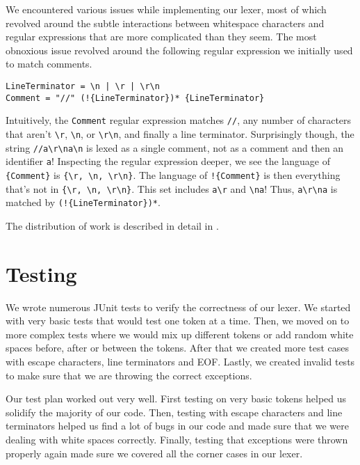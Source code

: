 \documentclass{hw}
\begin{document}
We encountered various issues while implementing our lexer, most of which
revolved around the subtle interactions between whitespace characters and
regular expressions that are more complicated than they seem. The most
obnoxious issue revolved around the following regular expression we initially
used to match comments.

\begin{center}
\begin{BVerbatim}
LineTerminator = \n | \r | \r\n
Comment = "//" (!{LineTerminator})* {LineTerminator}
\end{BVerbatim}
\end{center}

Intuitively, the \texttt{Comment} regular expression matches \texttt{//}, any
number of characters that aren't \verb$\r$, \verb$\n$, or \verb$\r\n$, and
finally a line terminator. Surprisingly though, the string \verb$//a\r\na\n$ is
lexed as a single comment, not as a comment and then an identifier \verb$a$!
Inspecting the regular expression deeper, we see the language of
\verb${Comment}$ is \verb${\r, \n, \r\n}$. The language of \verb$!{Comment}$ is
then everything that's not in \verb${\r, \n, \r\n}$. This set includes
\verb$a\r$ and \verb$\na$! Thus, \verb$a\r\na$ is matched by
\verb$(!{LineTerminator})*$.

The distribution of work is described in detail in .

\section{Testing}\label{sec:testing}
We wrote numerous JUnit tests to verify the correctness of our lexer. We
started with very basic tests that would test one token at a time. Then, we
moved on to more complex tests where we would mix up different tokens or add
random white spaces before, after or between the tokens. After that we created
more test cases with escape characters, line terminators and EOF. Lastly, we
created invalid tests to make sure that we are throwing the correct exceptions.

Our test plan worked out very well. First testing on very basic tokens helped
us solidify the majority of our code. Then, testing with escape characters and
line terminators helped us find a lot of bugs in our code and made sure that we
were dealing with white spaces correctly.  Finally, testing that exceptions
were thrown properly again made sure we covered all the corner cases in our
lexer.
\end{document}
